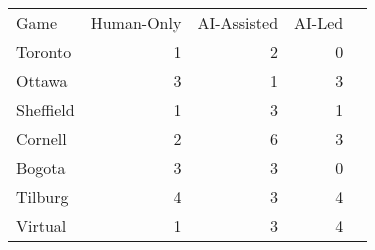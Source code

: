 \begin{tabular}{lrrrr}
\hline\hline
Game & Human-Only & AI-Assisted & AI-Led \\
Toronto & 1 & 2 & 0 \\
Ottawa & 3 & 1 & 3 \\
Sheffield & 1 & 3 & 1 \\
Cornell & 2 & 6 & 3 \\
Bogota & 3 & 3 & 0 \\
Tilburg & 4 & 3 & 4 \\
Virtual & 1 & 3 & 4 \\
\hline\hline
\end{tabular}
